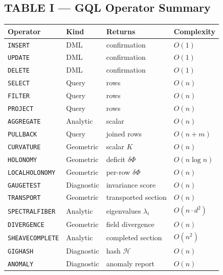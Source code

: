 \documentclass[11pt,letterpaper]{article}
\begin{document}
\subsection*{TABLE I --- GQL Operator Summary}

\begin{center}
\small
\begin{tabular}{@{}llll@{}}
\toprule
\textbf{Operator} & \textbf{Kind} & \textbf{Returns} & \textbf{Complexity} \\
\midrule
\texttt{INSERT}        & DML         & confirmation          & $O(1)$ \\
\texttt{UPDATE}        & DML         & confirmation          & $O(1)$ \\
\texttt{DELETE}        & DML         & confirmation          & $O(1)$ \\
\texttt{SELECT}        & Query       & rows                  & $O(n)$ \\
\texttt{FILTER}        & Query       & rows                  & $O(n)$ \\
\texttt{PROJECT}       & Query       & rows                  & $O(n)$ \\
\texttt{AGGREGATE}     & Analytic    & scalar                & $O(n)$ \\
\texttt{PULLBACK}      & Query       & joined rows           & $O(n+m)$ \\
\texttt{CURVATURE}     & Geometric   & scalar $K$            & $O(n)$ \\
\texttt{HOLONOMY}      & Geometric   & deficit $\delta\Phi$  & $O(n \log n)$ \\
\texttt{LOCALHOLONOMY} & Geometric   & per-row $\delta\Phi$  & $O(n)$ \\
\texttt{GAUGETEST}     & Diagnostic  & invariance score      & $O(n)$ \\
\texttt{TRANSPORT}     & Geometric   & transported section   & $O(n)$ \\
\texttt{SPECTRALFIBER} & Analytic    & eigenvalues $\lambda_i$& $O(n \cdot d^2)$ \\
\texttt{DIVERGENCE}    & Geometric   & field divergence      & $O(n)$ \\
\texttt{SHEAVECOMPLETE}& Analytic    & completed section     & $O(n^2)$ \\
\texttt{GIGHASH}       & Diagnostic  & hash $\mathcal{H}$    & $O(n)$ \\
\texttt{ANOMALY}       & Diagnostic  & anomaly report        & $O(n)$ \\

\end{tabular}
\end{center}
\end{document}

